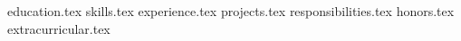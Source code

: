 \documentclass[11pt, a4paper]{awesome-cv}
\newcommand*{\sectiondir}{resume/}
\begin{document}
\makecvheader

{education.tex}
\vspace{-2mm}
{skills.tex}
\vspace{-2mm}
{experience.tex}
\vspace{-2mm}
{projects.tex}
\vspace{-5mm}
{responsibilities.tex}
\vspace{-2mm}
{honors.tex}
\vspace{-2mm}
{extracurricular.tex}
\end{document}
